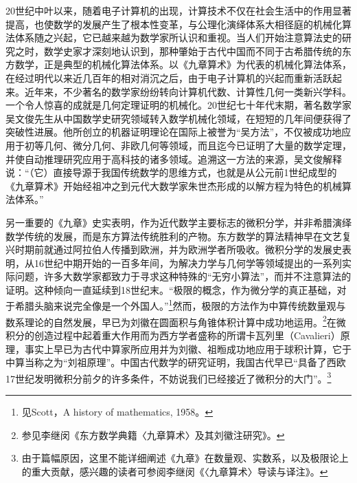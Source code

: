 \documentclass[a4paper,12pt,UTF8,twoside]{ctexbook}
\begin{document}
20世纪中叶以来，随着电子计算机的出现，计算技术不仅在社会生活中的作用显著提高，也使数学的发展产生了根本性变革，与公理化演绎体系大相径庭的机械化算法体系随之兴起，它已越来越为数学家所认识和重视。当人们开始注意算法史的研究之时，数学史家才深刻地认识到，那种肇始于古代中国而不同于古希腊传统的东方数学，正是典型的机械化算法体系。以《九章算术》为代表的机械化算法体系，在经过明代以来近几百年的相对消沉之后，由于电子计算机的兴起而重新活跃起来。近年来，不少著名的数学家纷纷转向计算机代数、计算性几何一类新兴学科。一个令人惊喜的成就是几何定理证明的机械化。20世纪七十年代末期，著名数学家吴文俊先生从中国数学史研究领域转入数学机械化领域，在短短的几年间便获得了突破性进展。他所创立的机器证明理论在国际上被誉为“吴方法”，不仅被成功地应用于初等几何、微分几何、非欧几何等领域，而且迄今已证明了大量的数学定理，并使自动推理研究应用于高科技的诸多领域。追溯这一方法的来源，吴文俊解释说：“（它）直接导源于我国传统数学的思维方式，也就是从公元前1世纪成型的《九章算术》开始经祖冲之到元代大数学家朱世杰形成的以解方程为特色的机械算法体系。”

另一重要的《九章》史实表明，作为近代数学主要标志的微积分学，并非希腊演绎数学传统的发展，而是东方算法传统胜利的产物。东方数学的算法精神早在文艺复兴时期前就通过阿拉伯人传播到欧洲，并为欧洲学者所吸收。微积分学的发展史表明，从16世纪中期开始的一百多年间，为解决力学与几何学等领域提出的一系列实际问题，许多大数学家都致力于寻求这种特殊的“无穷小算法”，而并不注意算法的证明。这种倾向一直延续到18世纪末。“极限的概念，作为微分学的真正基础，对于希腊头脑来说完全像是一个外国人。”\footnote{见Scott，A history of mathematics, 1958。}然而，极限的方法作为中算传统数量观与数系理论的自然发展，早已为刘徽在圆面积与角锥体积计算中成功地运用。\footnote{参见李继闵《东方数学典籍〈九章算术〉及其刘徽注研究》。}在微积分的创造过程中起着重大作用而为西方学者盛称的所谓卡瓦列里（Cavalieri）原理，事实上早已为古代中算家所应用并为刘徽、祖暅成功地应用于球积计算，它于中算当称之为“刘祖原理”。中国古代数学的研究证明，我国古代早已“具备了西欧17世纪发明微积分前夕的许多条件，不妨说我们已经接近了微积分的大门”。\footnote{由于篇幅原因，这里不能详细阐述《九章》在数量观、实数系，以及极限论上的重大贡献，感兴趣的读者可参阅李继闵《〈九章算术〉导读与译注》。}
\end{document}
